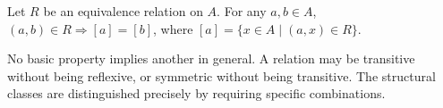 \begin{example*}
Let $R$ be an equivalence relation on $A$. For any $a,b \in A$,
$(a,b) \in R \Rightarrow [a] = [b]$, where $[a] = \{x \in A \mid (a,x) \in R\}$.
\end{example*}



\begin{remark*}
No basic property implies another in general. A relation may be transitive
without being reflexive, or symmetric without being transitive. The structural
classes are distinguished precisely by requiring specific combinations.
\end{remark*}
